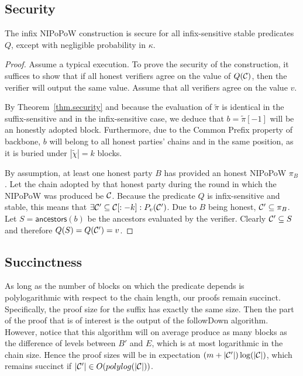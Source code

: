 \subsection{Security}
\begin{theorem}
The infix NIPoPoW construction is secure for all infix-sensitive stable
predicates $Q$, except with negligible probability in $\kappa$.
\end{theorem}
\begin{proof}
Assume a typical execution. To prove the security of the construction, it
suffices to show that if all honest verifiers agree on the value of $Q(\mathcal{C})$,
then the verifier will output the same value. Assume that all verifiers agree on
the value $v$.

By Theorem~\ref{thm.security} and because the evaluation of $\tilde\pi$ is
identical in the suffix-sensitive and in the infix-sensitive case, we deduce
that $b = \tilde\pi[-1]$ will be an honestly adopted block. Furthermore, due to
the Common Prefix property of backbone, $b$ will belong to all honest parties'
chains and in the same position, as it is buried under $|\tilde\chi| = k$
blocks.

By assumption, at least one honest party $B$ has provided an honest NIPoPoW
$\pi_B$. Let the chain adopted by that honest party during the round in which
the NIPoPoW was produced be $\mathcal{C}$. Because the predicate $Q$ is infix-sensitive
and stable, this means that $\exists \mathcal{C}' \subseteq \mathcal{C}[:-k]:
P_v(\mathcal{C}')$. Due to $B$ being honest, $\mathcal{C}' \subseteq \pi_B$. Let
$S = \textsf{ancestors}(b)$ be the ancestors evaluated by the verifier. Clearly
$\mathcal{C}' \subseteq S$ and therefore $Q(S) = Q(\mathcal{C}') = v$.
\Qed
\end{proof}

\subsection{Succinctness}
As long as the number of blocks on which the predicate depends is
polylogarithmic with respect to the chain length, our proofs remain succinct.
Specifically, the proof size for the suffix has exactly the same size. Then
the part of the proof that is of interest is the output of the followDown
algorithm. However, notice that this algorithm will on average produce as many
blocks as the difference of levels between $B'$ and $E$, which is at most
logarithmic in the chain size. Hence the proof sizes will be in expectation
$(m + |\mathcal{C}'|)\log(|\mathcal{C}|)$, which remains succinct if $|\mathcal{C}'| \in
O(polylog(|\mathcal{C}|))$.
